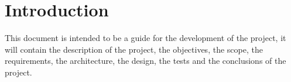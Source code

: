 \documentclass[twoside]{article}
\begin{document}


\tableofcontents

\clearpage

\section{Introduction}

This document is intended to be a guide for the development of the project, it will contain the description of the project, the objectives, the scope, the requirements, the architecture, the design, the tests and the conclusions of the project.
\end{document}

